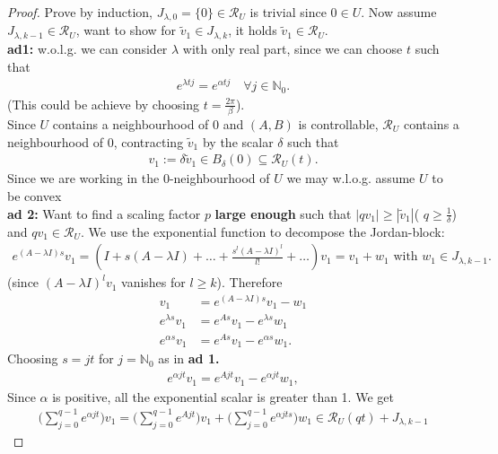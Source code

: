 \begin{proof}
	Prove by induction, $J_{\lambda, 0} = \{0\} \in \mathcal{R}_U$ is trivial since $0 \in U$. Now assume $J_{\lambda, k - 1} \in \mathcal{R}_U$, want to show for $\tilde{v}_1 \in J_{\lambda, k}$, it holds $\tilde{v}_1 \in \mathcal{R}_U$. \\
	\textbf{ad1:}  w.o.l.g. we can consider $\lambda$ with only real part, since we can choose $t$ such that 
	\begin{align*}
		e^{\lambda tj} = e^{\alpha tj } \quad \forall j \in \mathbb{N}_0.  
	\end{align*}
	(This could be achieve by choosing $t = \frac{2\pi}{\beta}$). \\
	Since $U$ contains a neighbourhood of $0$ and $(A, B)$ is controllable, $\mathcal{R}_U$ contains a neighbourhood of $0$,  contracting $\tilde{v}_1$ by the scalar $\delta$ such that
	\begin{align*}
		v_1 := \delta \tilde{v}_1 \in B_\delta (0) \subseteq \mathcal{R}_U(t).  
	\end{align*}
	Since we are working in the 0-neighbourhood of $U$ we may w.l.o.g. assume $U$ to be convex  \\
	\textbf{ad 2:}
	Want to find a scaling factor $p$ \textbf{large enough} such that $|q v_1| \ge |\tilde{v}_1|$( $q \ge \frac{1}{\delta}$)  and $q v_1 \in \mathcal{R}_U$. We use the exponential function to decompose the Jordan-block:
	\begin{align*}
		e^{(A - \lambda I)s} v_1 = (I + s (A - \lambda I) +  \dots +  \frac{ s^l (A - \lambda I)^l}{l!} +  \dots ) v_1 = v_1 +  w_1 \text{ with } w_1 \in J_{\lambda, k -1}. 
	\end{align*}
	(since $(A - \lambda I)^l v_1$ vanishes for $l \ge k$). Therefore
	\begin{align*}
		v_1 &= e^{(A - \lambda I)s} v_1 - w_1\\
		e^{\lambda s}v_1 &= e^{A s}v_1 - e^{\lambda s }w_1\\
		e^{\alpha s }v_1 &= e^{A s}v_1 - e^{\alpha s }w_1. 
	\end{align*}
	 Choosing $s = jt$ for $j = \mathbb{N}_0$ as in  \textbf{ad 1.}
	\begin{align*}
		e^{\alpha jt } v_1 = e^{Ajt}v_1 - e^{\alpha jt}w_1,
	\end{align*}
	Since $\alpha$ is positive, all the exponential scalar is greater than 1. We get
	\begin{align*}
		\bigg(\sum_{j = 0}^{q - 1} e^{\alpha jt}\bigg) v_1 = \bigg( \sum_{j = 0}^{ q- 1} e^{A j t}\bigg) v_1 + \bigg(\sum_{j = 0}^{q - 1} e^{\alpha jts}\bigg) w_1 \in \mathcal{R}_U(qt) + J_{\lambda, k -1}

\end{align*}
\end{proof}
